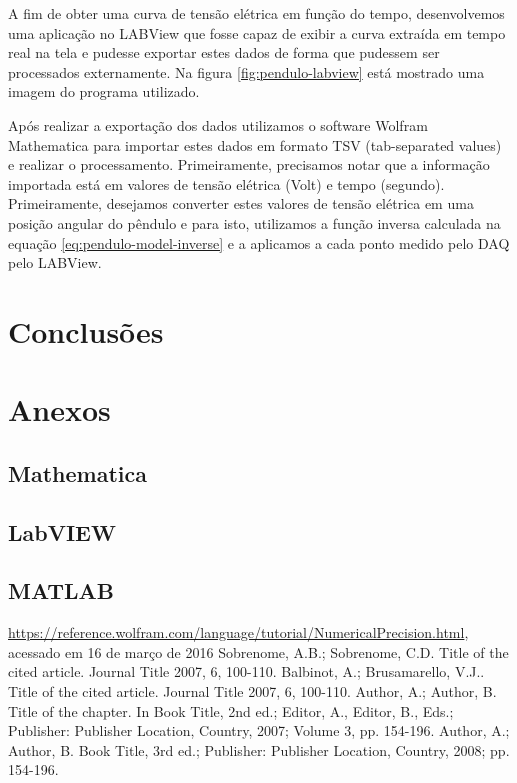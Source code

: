 \documentclass[12pt,a4paper]{instrumentacao}
\begin{document}
A fim de obter uma curva de tensão elétrica em função do tempo, desenvolvemos uma aplicação no LABView que fosse capaz de exibir a curva extraída em tempo real na tela e pudesse exportar estes dados de forma que pudessem ser processados externamente. Na figura \ref{fig:pendulo-labview} está mostrado uma imagem do programa utilizado.


Após realizar a exportação dos dados utilizamos o software Wolfram Mathematica para importar estes dados em formato TSV (tab-separated values) e realizar o processamento. Primeiramente, precisamos notar que a informação importada está em valores de tensão elétrica (Volt) e tempo (segundo). Primeiramente, desejamos converter estes valores de tensão elétrica em uma posição angular do pêndulo e para isto, utilizamos a função inversa calculada na equação \ref{eq:pendulo-model-inverse} e a aplicamos a cada ponto medido pelo DAQ pelo LABView.



\chapter{Conclusões}

\chapter*{Anexos}
\section{Mathematica}

\section{LabVIEW}

\section{MATLAB}

\begin{thebibliography}{9}
 \url{https://reference.wolfram.com/language/tutorial/NumericalPrecision.html}, acessado em 16 de março de 2016
 Sobrenome, A.B.; Sobrenome, C.D. Title of the cited article. Journal Title 2007, 6, 100-110. 
 Balbinot, A.; Brusamarello, V.J.. Title of the cited article. Journal Title 2007, 6, 100-110. 
 Author, A.; Author, B. Title of the chapter. In Book Title, 2nd ed.; Editor, A., Editor, B., Eds.; Publisher: Publisher Location, Country, 2007; Volume 3, pp. 154-196.
 Author, A.; Author, B. Book Title, 3rd ed.; Publisher: Publisher Location, Country, 2008; 
pp. 154-196.

\end{thebibliography}
\end{document}
